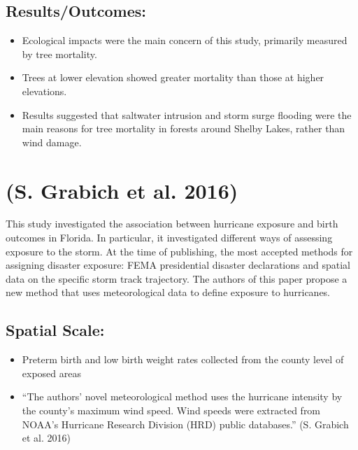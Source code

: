 \documentclass[
]{article}
\providecommand{\tightlist}{%
  \setlength{\itemsep}{0pt}\setlength{\parskip}{0pt}}
\begin{document}
\hypertarget{resultsoutcomes-5}{%
\subsection{Results/Outcomes:}\label{resultsoutcomes-5}}

\begin{itemize}
\tightlist
\item
  Ecological impacts were the main concern of this study, primarily
  measured by tree mortality.
\item
  Trees at lower elevation showed greater mortality than those at higher
  elevations.
\item
  Results suggested that saltwater intrusion and storm surge flooding
  were the main reasons for tree mortality in forests around Shelby
  Lakes, rather than wind damage.
\end{itemize}

\hypertarget{grabich2016measuring}{%
\section{(S. Grabich et al. 2016)}\label{grabich2016measuring}}

This study investigated the association between hurricane exposure and
birth outcomes in Florida. In particular, it investigated different ways
of assessing exposure to the storm. At the time of publishing, the most
accepted methods for assigning disaster exposure: FEMA presidential
disaster declarations and spatial data on the specific storm track
trajectory. The authors of this paper propose a new method that uses
meteorological data to define exposure to hurricanes.

\hypertarget{spatial-scale-7}{%
\subsection{Spatial Scale:}\label{spatial-scale-7}}

\begin{itemize}
\tightlist
\item
  Preterm birth and low birth weight rates collected from the county
  level of exposed areas
\item
  ``The authors' novel meteorological method uses the hurricane
  intensity by the county's maximum wind speed. Wind speeds were
  extracted from NOAA's Hurricane Research Division (HRD) public
  databases.'' (S. Grabich et al. 2016)
\end{itemize}
\end{document}
